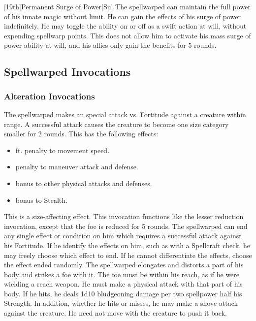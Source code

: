 [19th]{Permanent Surge of Power}[Su]
The spellwarped can maintain the full power of his innate magic without limit.
He can gain the effects of his surge of power indefinitely.
He may toggle the ability on or off as a swift action at will, without expending spellwarp points.
This does not allow him to activate his mass surge of power ability at will, and his allies only gain the benefits for 5 rounds.

\subsection{Spellwarped Invocations}\label{Spellwarped Invocations}

\subsubsection{Alteration Invocations}
The spellwarped makes an special attack vs. Fortitude against a creature within \rngclose range.
A successful attack causes the creature to become one size category smaller for 2 rounds.
This has the following effects:
\begin{itemize} 
    \item {} ft.
        penalty to movement speed.
    \item {} penalty to maneuver attack and defense.
    \item {} bonus to other physical attacks and defenses.
    \item {} bonus to Stealth.
\end{itemize}
This is a size-affecting effect.
This invocation functions like the lesser reduction invocation, except that the foe is reduced for 5 rounds.
The spellwarped can end any single effect or condition on him which requires a successful attack against his Fortitude.
If he identify the effects on him, such as with a Spellcraft check, he may freely choose which effect to end.
If he cannot differentiate the effects, choose the effect ended randomly.
The spellwarped elongates and distorts a part of his body and strikes a foe with it.
The foe must be within his reach, as if he were wielding a reach weapon.
He must make a physical attack with that part of his body.
If he hits, he deals 1d10 bludgeoning damage per two spellpower \add half his Strength.
In addition, whether he hits or misses, he may make a shove attack against the creature.
He need not move with the creature to push it back.
